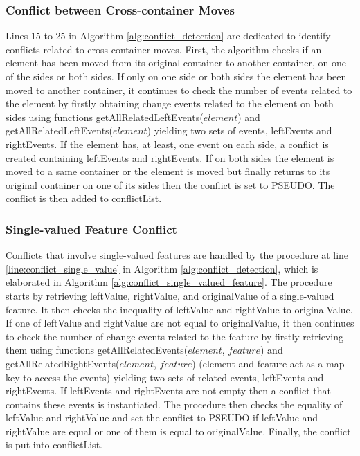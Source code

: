 \subsubsection{Conflict between Cross-container Moves} 
\label{sec:move_conflict} 
Lines 15 to 25 in Algorithm \ref{alg:conflict_detection} are dedicated to identify conflicts related to cross-container moves. 
First, the algorithm checks if an element has been moved from its original container to another container, on one of the sides or both sides. 
If only on one side or both sides the element has been moved to another container, 
it continues to check the number of events related to the element by firstly obtaining change events related to the element on 
both sides using functions \textsf{getAllRelatedLeftEvents($element$)} and \textsf{getAllRelatedLeftEvents($element$)} yielding two sets of events, 
\textsf{leftEvents} and \textsf{rightEvents}. If the element has, at least, one event on each side,
a conflict is created containing \textsf{leftEvents} and \textsf{rightEvents}. 
If on both sides the element is moved to a same container or the element is moved but finally returns to its original container on one of its sides then the conflict is set to \textsf{PSEUDO}. The conflict is then added to \textsf{conflictList}. 

\subsubsection{Single-valued Feature Conflict} 
\label{sec:single_valued_conflict}
Conflicts that involve single-valued features are handled by the procedure at line \ref{line:conflict_single_value} in Algorithm \ref{alg:conflict_detection}, which is elaborated in Algorithm \ref{alg:conflict_single_valued_feature}. The procedure starts by retrieving \textsf{leftValue}, \textsf{rightValue}, and \textsf{originalValue} of a single-valued feature. It then checks the inequality of \textsf{leftValue} and \textsf{rightValue} to \textsf{originalValue}. If one of \textsf{leftValue} and \textsf{rightValue} are not equal to \textsf{originalValue}, it then continues to check the number of change events related to the feature by firstly retrieving them using functions \textsf{getAllRelatedEvents($element$, $feature$)} and \textsf{getAllRelatedRightEvents($element$, $feature$)} (element and feature act as a map key to access the events) yielding two sets of related events, \textsf{leftEvents} and \textsf{rightEvents}. If \textsf{leftEvents} and \textsf{rightEvents} are not empty then a conflict that contains these events is instantiated. The procedure then checks the equality of \textsf{leftValue} and \textsf{rightValue} and set the conflict to \textsf{PSEUDO} if \textsf{leftValue} and \textsf{rightValue} are equal or one of them is equal to \textsf{originalValue}. Finally, the conflict is put into \textsf{conflictList}. 

